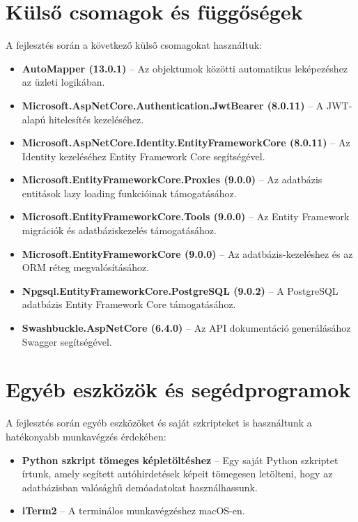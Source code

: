 \documentclass{report}[11pt]
\begin{document}
\section{Külső csomagok és függőségek}
A fejlesztés során a következő külső csomagokat használtuk:

\begin{itemize}
    \item \textbf{AutoMapper (13.0.1)} – Az objektumok közötti automatikus leképezéshez az üzleti logikában.
    \item \textbf{Microsoft.AspNetCore.Authentication.JwtBearer (8.0.11)} – A JWT-alapú hitelesítés kezeléséhez.
    \item \textbf{Microsoft.AspNetCore.Identity.EntityFrameworkCore (8.0.11)} – Az Identity kezeléséhez Entity Framework Core segítségével.
    \item \textbf{Microsoft.EntityFrameworkCore.Proxies (9.0.0)} – Az adatbázis entitások lazy loading funkcióinak támogatásához.
    \item \textbf{Microsoft.EntityFrameworkCore.Tools (9.0.0)} – Az Entity Framework migrációk és adatbáziskezelés támogatásához.
    \item \textbf{Microsoft.EntityFrameworkCore (9.0.0)} – Az adatbázis-kezeléshez és az ORM réteg megvalósításához.
    \item \textbf{Npgsql.EntityFrameworkCore.PostgreSQL (9.0.2)} – A PostgreSQL adatbázis Entity Framework Core támogatásához.
    \item \textbf{Swashbuckle.AspNetCore (6.4.0)} – Az API dokumentáció generálásához Swagger segítségével.
\end{itemize}

\section{Egyéb eszközök és segédprogramok}
A fejlesztés során egyéb eszközöket és saját szkripteket is használtunk a hatékonyabb munkavégzés érdekében:

\begin{itemize}
    \item \textbf{Python szkript tömeges képletöltéshez} – Egy saját Python szkriptet írtunk, amely segített autóhirdetések képeit tömegesen letölteni, hogy az adatbázisban valósághű demóadatokat használhassunk.
    \item \textbf{iTerm2} – A terminálos munkavégzéshez macOS-en.
\end{itemize}
\end{document}
